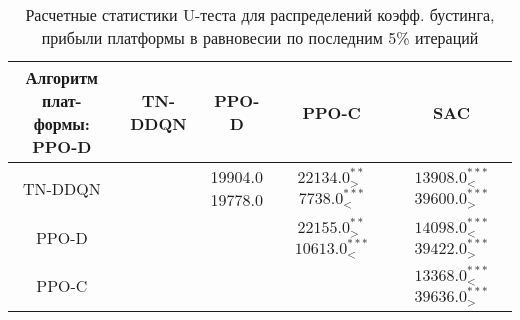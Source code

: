 \bgroup
\def\arraystretch{1.25}
\begin{table}[H]
	\caption{Расчетные статистики U-теста для распределений коэфф. бустинга, прибыли платформы в равновесии по последним 5\% итераций}
	\label{tables:ks_dynamic:alpha_pi_plat}
	\begin{center}
		\vspace{-0.5em}
		\begin{tabular}{c||cccc}
			\toprule
			\makecell{Алгоритм плат-\\ формы: PPO-D} & TN-DDQN & PPO-D & PPO-C & SAC \\
			\midrule
			TN-DDQN & \makecell[c]{ \\[1ex] } & \makecell[c]{ 19904.0\\19778.0\\[1ex] } & \makecell[c]{ $22134.0^{**}_{>} $\\$7738.0^{***}_{<} $\\[1ex] } & \makecell[c]{ $13908.0^{***}_{<} $\\$39600.0^{***}_{>} $\\[1ex] } \\
			PPO-D & \makecell[c]{ \\[1ex] } & \makecell[c]{ \\[1ex] } & \makecell[c]{ $22155.0^{**}_{>} $\\$10613.0^{***}_{<} $\\[1ex] } & \makecell[c]{ $14098.0^{***}_{<} $\\$39422.0^{***}_{>} $\\[1ex] } \\
			PPO-C & \makecell[c]{ \\[1ex] } & \makecell[c]{ \\[1ex] } & \makecell[c]{ \\[1ex] } & \makecell[c]{ $13368.0^{***}_{<} $\\$39636.0^{***}_{>} $\\[1ex] } \\
			\bottomrule
		\end{tabular}
	\end{center}
\end{table}
\egroup